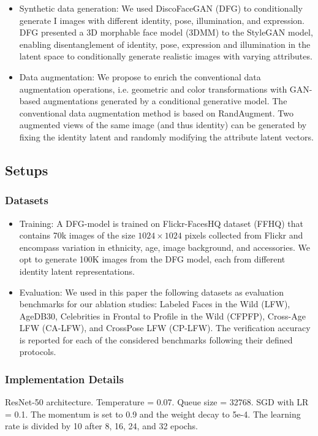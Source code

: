 \documentclass[12pt]{article}
\begin{document}
\begin{itemize}
\begin{center}
  \end{center}
  \item  Synthetic data generation: We used DiscoFaceGAN (DFG) to conditionally generate I images with different identity, pose, illumination,
  and expression. DFG presented a 3D morphable face model
  (3DMM) to the StyleGAN model, enabling disentanglement of identity, pose, expression and illumination in the
  latent space to conditionally generate realistic images with
  varying attributes.
  \item Data augmentation: We propose to enrich the conventional data augmentation
  operations, i.e. geometric and color transformations with
  GAN-based augmentations generated by a conditional generative model. The conventional data augmentation method
  is based on RandAugment. Two augmented views of the
  same image (and thus identity) can be generated by fixing
  the identity latent and randomly modifying the attribute
  latent vectors.
\end{itemize}
\subsection{Setups}
\subsubsection{Datasets}
\begin{itemize}
  \item Training: A DFG-model is trained on Flickr-FacesHQ dataset (FFHQ) that contains 70k images of the size
  $1024\times1024$ pixels collected from Flickr and encompass variation in ethnicity, age, image background, and accessories. We opt to generate 100K images from the DFG model,
  each from different identity latent representations.
  \item Evaluation: We used in this paper the
  following datasets as evaluation benchmarks for our ablation
  studies: Labeled Faces in the Wild (LFW), AgeDB30, Celebrities in Frontal to Profile in the Wild (CFPFP), Cross-Age LFW (CA-LFW), and CrossPose LFW (CP-LFW). The verification accuracy is
  reported for each of the considered benchmarks following
  their defined protocols.
\end{itemize}
\subsubsection{Implementation Details}
ResNet-50 architecture. Temperature = 0.07. Queue size = 32768. SGD with LR = 0.1. The momentum is set to 0.9 and
the weight decay to 5e-4. The learning rate is divided by
10 after 8, 16, 24, and 32 epochs.
\end{document}

